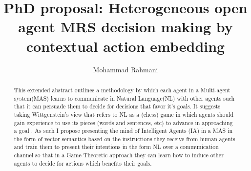 \documentclass{article}
\begin{document}
	
	\title{PhD proposal: Heterogeneous open agent MRS decision making by contextual action embedding}
	\author{Mohammad Rahmani}
	\date{}
	\maketitle
	
	\begin{abstract}
	This extended abstract outlines a methodology by which each agent in a Multi-agent system(MAS) learns to communicate in Natural Language(NL) with other agents such that it can persuade them to decide for decisions that favor it's goals. It suggests taking Wittgenstein's view that refers to NL as a (chess) game in which agents should gain experience to use its pieces (words and sentences, etc) to advance in approaching a goal \citep{kenny-1973-wittgenstein}. As such I propose presenting the mind of Intelligent Agents (IA) in a MAS in the form of vector semantics based on the instructions they receive from human agents and train them to present their intentions in the form NL over a communication channel so that in a Game Theoretic approach they can learn how to induce other agents to decide for actions which benefits their goals.  
	\end{abstract}
\end{document}
